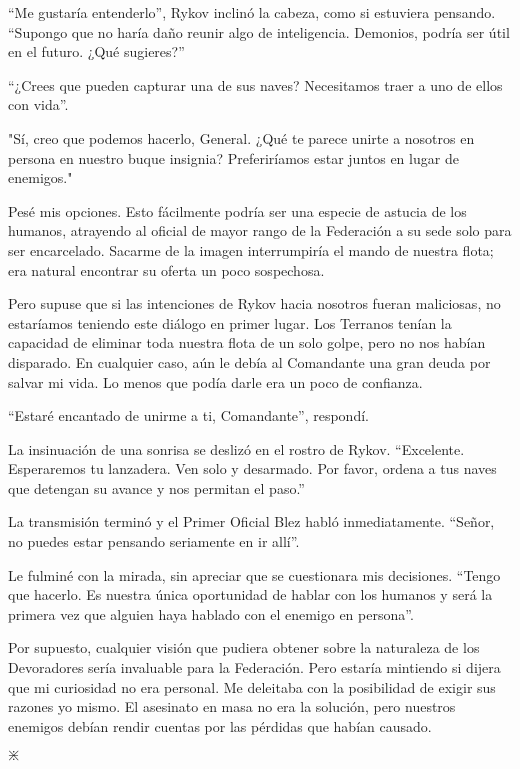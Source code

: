 \documentclass[spanish,12pt,a4paper,oneside,titlepage]{book}
\begin{document}
    “Me gustaría entenderlo”, Rykov inclinó la cabeza, como si estuviera pensando. “Supongo que no haría daño reunir algo de inteligencia. Demonios, podría ser útil en el futuro. ¿Qué sugieres?”

    “¿Crees que pueden capturar una de sus naves? Necesitamos traer a uno de ellos con vida”.

    "Sí, creo que podemos hacerlo, General. ¿Qué te parece unirte a nosotros en persona en nuestro buque insignia? Preferiríamos estar juntos en lugar de enemigos."

    Pesé mis opciones. Esto fácilmente podría ser una especie de astucia de los humanos, atrayendo al oficial de mayor rango de la Federación a su sede solo para ser encarcelado. Sacarme de la imagen interrumpiría el mando de nuestra flota; era natural encontrar su oferta un poco sospechosa.

    Pero supuse que si las intenciones de Rykov hacia nosotros fueran maliciosas, no estaríamos teniendo este diálogo en primer lugar. Los Terranos tenían la capacidad de eliminar toda nuestra flota de un solo golpe, pero no nos habían disparado. En cualquier caso, aún le debía al Comandante una gran deuda por salvar mi vida. Lo menos que podía darle era un poco de confianza.

    “Estaré encantado de unirme a ti, Comandante”, respondí.

    La insinuación de una sonrisa se deslizó en el rostro de Rykov. “Excelente. Esperaremos tu lanzadera. Ven solo y desarmado. Por favor, ordena a tus naves que detengan su avance y nos permitan el paso.”

    La transmisión terminó y el Primer Oficial Blez habló inmediatamente. “Señor, no puedes estar pensando seriamente en ir allí”.

    Le fulminé con la mirada, sin apreciar que se cuestionara mis decisiones. “Tengo que hacerlo. Es nuestra única oportunidad de hablar con los humanos y será la primera vez que alguien haya hablado con el enemigo en persona”.

    Por supuesto, cualquier visión que pudiera obtener sobre la naturaleza de los Devoradores sería invaluable para la Federación. Pero estaría mintiendo si dijera que mi curiosidad no era personal. Me deleitaba con la posibilidad de exigir sus razones yo mismo. El asesinato en masa no era la solución, pero nuestros enemigos debían rendir cuentas por las pérdidas que habían causado.

    \begin{center} {\Huge $\divideontimes$} \end{center}
\end{document}
